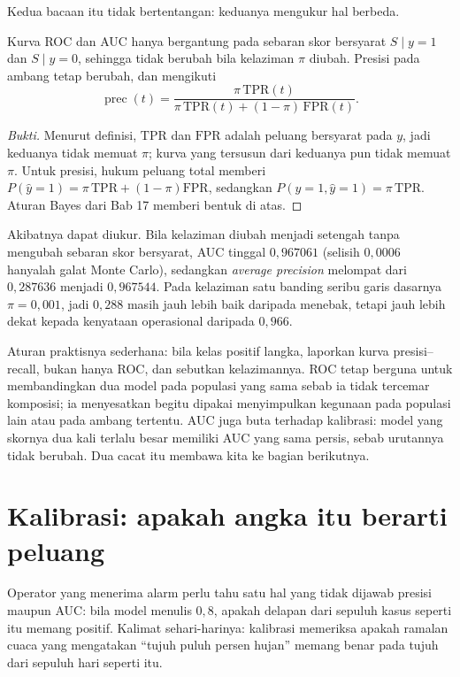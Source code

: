 Kedua bacaan itu tidak bertentangan: keduanya mengukur hal berbeda.

\begin{proposisi}
Kurva ROC dan AUC hanya bergantung pada sebaran skor bersyarat $S\mid y=1$ dan
$S\mid y=0$, sehingga tidak berubah bila kelaziman $\pi$ diubah. Presisi pada ambang
tetap berubah, dan mengikuti
\[
\operatorname{prec}(t)=\frac{\pi\,\mathrm{TPR}(t)}
{\pi\,\mathrm{TPR}(t)+(1-\pi)\,\mathrm{FPR}(t)} .
\]
\end{proposisi}

\begin{proof}[Bukti]
Menurut definisi, $\mathrm{TPR}$ dan $\mathrm{FPR}$ adalah peluang bersyarat pada $y$,
jadi keduanya tidak memuat $\pi$; kurva yang tersusun dari keduanya pun tidak memuat
$\pi$. Untuk presisi, hukum peluang total memberi
$P(\hat y=1)=\pi\,\mathrm{TPR}+(1-\pi)\mathrm{FPR}$, sedangkan
$P(y=1,\hat y=1)=\pi\,\mathrm{TPR}$. Aturan Bayes dari Bab 17 memberi bentuk di atas.
\end{proof}

Akibatnya dapat diukur. Bila kelaziman diubah menjadi setengah tanpa mengubah
sebaran skor bersyarat, AUC tinggal $0{,}967061$ (selisih $0{,}0006$ hanyalah galat
Monte Carlo), sedangkan \emph{average precision} melompat dari $0{,}287636$ menjadi
$0{,}967544$. Pada kelaziman satu banding seribu garis dasarnya $\pi=0{,}001$, jadi
$0{,}288$ masih jauh lebih baik daripada menebak, tetapi jauh lebih dekat kepada
kenyataan operasional daripada $0{,}966$.

Aturan praktisnya sederhana: bila kelas positif langka, laporkan kurva presisi--recall,
bukan hanya ROC, dan sebutkan kelazimannya. ROC tetap berguna untuk membandingkan dua model
pada populasi yang sama sebab ia tidak tercemar komposisi; ia menyesatkan begitu dipakai
menyimpulkan kegunaan pada populasi lain atau pada ambang tertentu. AUC juga buta terhadap
kalibrasi: model yang skornya dua kali terlalu besar memiliki AUC yang sama persis, sebab
urutannya tidak berubah. Dua cacat itu membawa kita ke bagian berikutnya.

\section{Kalibrasi: apakah angka itu berarti peluang}

Operator yang menerima alarm perlu tahu satu hal yang tidak dijawab presisi maupun AUC:
bila model menulis $0{,}8$, apakah delapan dari sepuluh kasus seperti itu memang positif.
Kalimat sehari-harinya: kalibrasi memeriksa apakah ramalan cuaca yang mengatakan ``tujuh
puluh persen hujan'' memang benar pada tujuh dari sepuluh hari seperti itu.

